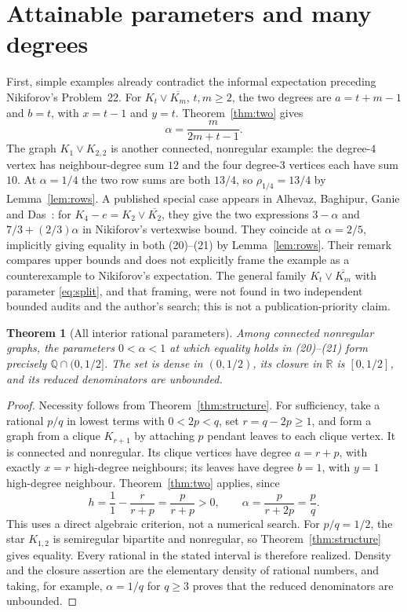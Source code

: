 \documentclass[11pt]{amsart}
\newtheorem{theorem}{Theorem}[section]
\theoremstyle{remark}
\newcommand{\QQ}{\mathbb{Q}}
\begin{document}
\section{Attainable parameters and many degrees}\label{sec:examples}
First, simple examples already contradict the informal expectation
preceding Nikiforov's Problem~22. For $K_t\vee\overline{K_m}$,
$t,m\geq2$, the two degrees are $a=t+m-1$ and $b=t$, with
$x=t-1$ and $y=t$. Theorem~\ref{thm:two} gives
\begin{equation}\label{eq:split}
 \alpha=\frac{m}{2m+t-1}.
\end{equation}
The graph $K_1\vee K_{2,2}$ is another connected, nonregular example:
the degree-$4$ vertex has neighbour-degree sum $12$ and the four
degree-$3$ vertices each have sum $10$. At $\alpha=1/4$ the two
row sums are both $13/4$, so $\rho_{1/4}=13/4$ by
Lemma~\ref{lem:rows}. A published special case appears in Alhevaz, Baghipur, Ganie and
Das~\cite[Remark~2.4]{AlhevazEtAl2023}: for
$K_4-e=K_2\vee\overline{K_2}$, they give the two expressions
$3-\alpha$ and $7/3+(2/3)\alpha$ in Nikiforov's vertexwise bound.
They coincide at $\alpha=2/5$, implicitly giving equality in both
(20)--(21) by Lemma~\ref{lem:rows}. Their remark compares upper
bounds and does not explicitly frame the example as a counterexample
to Nikiforov's expectation. The general family
$K_t\vee\overline{K_m}$ with parameter \eqref{eq:split}, and that
framing, were not found in two independent bounded audits and the
author's search; this is not a publication-priority claim.

\begin{theorem}[All interior rational parameters]\label{thm:rationals}
Among connected nonregular graphs, the parameters $0<\alpha<1$
at which equality holds in (20)--(21) form precisely
$\QQ\cap(0,1/2]$. The set is dense in $(0,1/2)$, its closure in
$\mathbb R$ is $[0,1/2]$, and its reduced denominators are unbounded.
\end{theorem}
\begin{proof}
Necessity follows from Theorem~\ref{thm:structure}.
For sufficiency, take a rational $p/q$ in lowest terms with
$0<2p<q$, set $r=q-2p\geq1$, and form a graph from a clique
$K_{r+1}$ by attaching $p$ pendant leaves to each clique vertex.
It is connected and nonregular. Its clique vertices have degree
$a=r+p$, with exactly $x=r$ high-degree neighbours; its leaves
have degree $b=1$, with $y=1$ high-degree neighbour.
Theorem~\ref{thm:two} applies, since
\[
 h=\frac11-\frac{r}{r+p}=\frac{p}{r+p}>0,
 \qquad \alpha=\frac{p}{r+2p}=\frac pq.
\]
This uses a direct algebraic criterion, not a numerical search.
For $p/q=1/2$, the star $K_{1,2}$ is semiregular bipartite
and nonregular, so Theorem~\ref{thm:structure} gives equality.
Every rational in the stated interval is therefore realized.
Density and the closure assertion are the elementary density of
rational numbers, and taking, for example, $\alpha=1/q$ for
$q\geq3$ proves that the reduced denominators are unbounded.
\end{proof}
\end{document}
